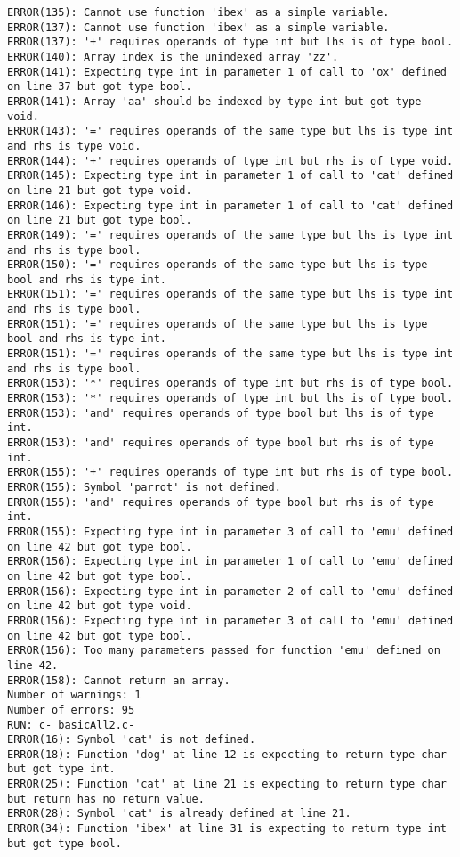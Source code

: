 \documentclass[12pt]{book}
\begin{document}
\begin{lstlisting}
ERROR(135): Cannot use function 'ibex' as a simple variable.
ERROR(137): Cannot use function 'ibex' as a simple variable.
ERROR(137): '+' requires operands of type int but lhs is of type bool.
ERROR(140): Array index is the unindexed array 'zz'.
ERROR(141): Expecting type int in parameter 1 of call to 'ox' defined on line 37 but got type bool.
ERROR(141): Array 'aa' should be indexed by type int but got type void.
ERROR(143): '=' requires operands of the same type but lhs is type int and rhs is type void.
ERROR(144): '+' requires operands of type int but rhs is of type void.
ERROR(145): Expecting type int in parameter 1 of call to 'cat' defined on line 21 but got type void.
ERROR(146): Expecting type int in parameter 1 of call to 'cat' defined on line 21 but got type bool.
ERROR(149): '=' requires operands of the same type but lhs is type int and rhs is type bool.
ERROR(150): '=' requires operands of the same type but lhs is type bool and rhs is type int.
ERROR(151): '=' requires operands of the same type but lhs is type int and rhs is type bool.
ERROR(151): '=' requires operands of the same type but lhs is type bool and rhs is type int.
ERROR(151): '=' requires operands of the same type but lhs is type int and rhs is type bool.
ERROR(153): '*' requires operands of type int but rhs is of type bool.
ERROR(153): '*' requires operands of type int but lhs is of type bool.
ERROR(153): 'and' requires operands of type bool but lhs is of type int.
ERROR(153): 'and' requires operands of type bool but rhs is of type int.
ERROR(155): '+' requires operands of type int but rhs is of type bool.
ERROR(155): Symbol 'parrot' is not defined.
ERROR(155): 'and' requires operands of type bool but rhs is of type int.
ERROR(155): Expecting type int in parameter 3 of call to 'emu' defined on line 42 but got type bool.
ERROR(156): Expecting type int in parameter 1 of call to 'emu' defined on line 42 but got type bool.
ERROR(156): Expecting type int in parameter 2 of call to 'emu' defined on line 42 but got type void.
ERROR(156): Expecting type int in parameter 3 of call to 'emu' defined on line 42 but got type bool.
ERROR(156): Too many parameters passed for function 'emu' defined on line 42.
ERROR(158): Cannot return an array.
Number of warnings: 1
Number of errors: 95
RUN: c- basicAll2.c-
ERROR(16): Symbol 'cat' is not defined.
ERROR(18): Function 'dog' at line 12 is expecting to return type char but got type int.
ERROR(25): Function 'cat' at line 21 is expecting to return type char but return has no return value.
ERROR(28): Symbol 'cat' is already defined at line 21.
ERROR(34): Function 'ibex' at line 31 is expecting to return type int but got type bool.

\end{lstlisting}
\end{document}
